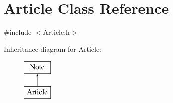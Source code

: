\hypertarget{classArticle}{\section{\-Article \-Class \-Reference}
\label{classArticle}
}


{\ttfamily \#include $<$\-Article.\-h$>$}

\-Inheritance diagram for \-Article\-:\begin{figure}[H]
\begin{center}
\leavevmode
\includegraphics[height=2.000000cm]{classArticle}
\end{center}
\end{figure}
